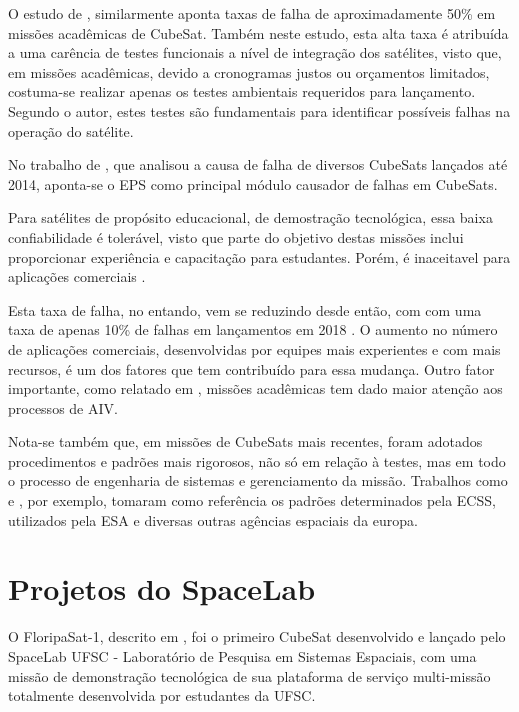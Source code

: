 O estudo de \textcite{first-100-cubesats}, similarmente aponta taxas de falha de aproximadamente 50\% em missões acadêmicas de CubeSat.
Também neste estudo, esta alta taxa é atribuída a uma carência de testes funcionais a nível de integração dos satélites, visto que, em missões acadêmicas, devido a cronogramas justos ou orçamentos limitados, costuma-se realizar apenas os testes ambientais requeridos para lançamento.
Segundo o autor, estes testes são fundamentais para identificar possíveis falhas na operação do satélite.

No trabalho de \textcite{reliability-of-cubesats}, que analisou a causa de falha de diversos CubeSats lançados até 2014, aponta-se o \gls{EPS} como principal módulo causador de falhas em CubeSats.

Para satélites de propósito educacional, de demostração tecnológica, essa baixa confiabilidade é tolerável, visto que parte do objetivo destas missões inclui proporcionar experiência e capacitação para estudantes.
Porém, é inaceitavel para aplicações comerciais \cite{overview-nanosat-test}.

Esta taxa de falha, no entando, vem se reduzindo desde então, com com uma taxa de apenas 10\% de falhas em lançamentos em 2018 \cite{aiv-istsat-1}.
O aumento no número de aplicações comerciais, desenvolvidas por equipes mais experientes e com mais recursos, é um dos fatores que tem contribuído para essa mudança.
Outro fator importante, como relatado em \textcite{aiv-istsat-1}, missões acadêmicas tem dado maior atenção aos processos de \gls{AIV}.

Nota-se também que, em missões de CubeSats mais recentes, foram adotados procedimentos e padrões mais rigorosos, não só em relação à testes, mas em todo o processo de engenharia de sistemas e gerenciamento da missão.
Trabalhos como \textcite{floripasat-1} e \textcite{tailoring-ecss-nanosat}, por exemplo, tomaram como referência os padrões determinados pela \gls{ECSS}, utilizados pela \gls{ESA} e diversas outras agências espaciais da europa.

\section{Projetos do SpaceLab}\label{sec:intro-spacelab}

O FloripaSat-1, descrito em \textcite{floripasat-1}, foi o primeiro CubeSat desenvolvido e lançado pelo SpaceLab UFSC - Laboratório de Pesquisa em Sistemas Espaciais, com uma missão de demonstração tecnológica de sua plataforma de serviço multi-missão totalmente desenvolvida por estudantes da \gls{UFSC}.

